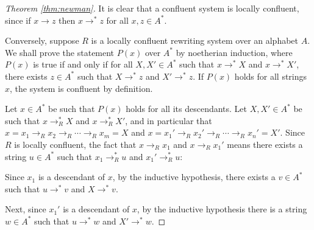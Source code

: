 \documentclass[11pt,libertine,widepage,nosubthm]{lmaths}
\begin{document}
\begin{proof}[Theorem \ref{thm:newman}]
	It is clear that a confluent system is locally confluent, since if $x \to z$ then $x \to^* z$ for all $x, z \in A^*$.

	Conversely, suppose $R$ is a locally confluent rewriting system over an alphabet $A$. We shall prove the statement $P(x)$ over $A^*$ by noetherian induction, where $P(x)$ is true if and only if for all $X, X' \in A^*$ such that $x \to^* X$ and $x \to^* X'$, there exists $z \in A^*$ such that $X \to^* z$ and $X' \to^* z$. If $P(x)$ holds for all strings $x$, the system is confluent by definition. 

	Let $x \in A^*$ be such that $P(x)$ holds for all its descendants. Let $X, X' \in A^*$ be such that $x \to_R^* X$ and $x \to_R^* X'$, and in particular that $x = x_1 \to_R x_2 \to_R \cdots \to_R x_m = X$ and $x = x_1' \to_R x_2' \to_R \cdots \to_R x_n' = X'$. Since $R$ is locally confluent, the fact that $x \to_R x_1$ and $x \to_R x_1'$ means there exists a string $u \in A^*$ such that $x_1 \to_R^* u$ and $x_1' \to_R^* u$:

	{\centering
	\par}

	Since $x_1$ is a descendant of $x$, by the inductive hypothesis, there exists a $v \in A^*$ such that $u \to^* v$ and $X \to^* v$.

	{\centering
	\par}

	Next, since $x_1'$ is a descendant of $x$, by the inductive hypothesis there is a string $w \in A^*$ such that $u \to^* w$ and $X' \to^* w$.

	{\centering
	\par}


\end{proof}
\end{document}
